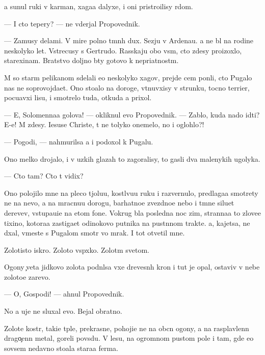 \documentclass[10pt]{book}
\begin{document}
{\Y}a sunul ruki v karman{\yi}, xaga{\y}a dalyxe, i oni pristro{\y}ilisy r{\ia}dom.

— I cto tepery? — ne v{\yi}derjal Pro\-po\-ved\-nik.

— Za{\y}musy delami. V mire polno t{\e}mn{\yi}h dux. S{\y}ezju v Ardenau. {\Y}a ne b{\yi}l na rodine neskolyko let. Vstrecusy s Gertrudo{\y}. Rasskaju obo vs{\e}m, cto zdesy proizoxlo, stare{\y}xinam. Bratstvo doljno b{\yi}ty gotovo k nepri{\y}atnost{\ia}m.

M{\yi} so star{\yi}m pelikanom sdelali {\y}e{\x}o neskolyko xagov, prejde cem pon{\ia}li, cto Pugalo nas ne soprovojda{\y}et. Ono sto{\y}alo na do\-ro\-ge, v{\yi}t{\ia}nuvxisy v strunku, tocno terrier, pocu{\y}avxi{\y} lisu, i smotrelo tuda, otkuda {\y}a prixol.

— E{\y}, Solomenna{\y}a golova! — okliknul {\y}evo Pro\-po\-ved\-nik. — Zab{\yi}lo, kuda nado idti? E-e{\y}! M{\yi} zdesy. Iesuse Christe, t{\yi} ne tolyko onemelo, no i oglohlo?!

— Pogodi, — nahmurilsa {\y}a i podoxol k Pugalu.

Ono melko drojalo, i v uzkih glazah to zagoralisy, to gasli dva malenykih ugolyka.

— Cto tam? Cto t{\yi} vidix?

Ono polojilo mne na pleco t{\ia}jolu{\y}u, kostl{\ia}vu{\y}u ruku i razvernulo, predlaga{\y}a smotrety ne na nevo, a na mracnu{\y}u do\-ro\-gu, barhatno{\y}e zvezdno{\y}e nebo i t{\e}mn{\yi}{\y}e siluet{\yi} derev{\y}ev, v{\yi}stupa{\y}u{\x}i{\y}e na etom fone. Vokrug b{\yi}la posledn{\ia}{\y}a noc zim{\yi}, stranna{\y}a to{\y} zlove{\x}e{\y} tixino{\y}, kotora{\y}a zastiga{\y}et odinokovo putnika na pu\-st{\yi}n\-nom trakte. {\Y}a, kajetsa, ne d{\yi}xal, vmeste s Pugalom smotr{\ia} vo mrak. I tot otvetil mne.

Zolotisto{\y} iskro{\y}. Zoloto{\y} vsp{\yi}xko{\y}. Zolot{\yi}m svetom.

Ogony {\c}veta jidkovo zolota podn{\ia}lsa v{\yi}xe drevesn{\yi}h kron i tut je opal, ostaviv v nebe zoloto{\y}e zarevo.

— O, Gospodi! — ahnul Pro\-po\-ved\-nik.

No {\y}a uje ne sluxal {\y}evo. Bejal obratno.



Zolot{\yi}{\y}e kostr{\yi}, taki{\y}e t{\e}pl{\yi}{\y}e, prekrasn{\yi}{\y}e, pohoji{\y}e ne na ob{\yi}cn{\yi}{\y} ogony, a na rasplavlenn{\yi}{\y} drago{\c}enn{\yi}{\y} metal, goreli povs{\io}du. V lesu, na ogromnom pustom pole i tam, gde {\y}e{\x}o sovsem nedavno sto{\y}ala stara{\y}a ferma.
\end{document}
